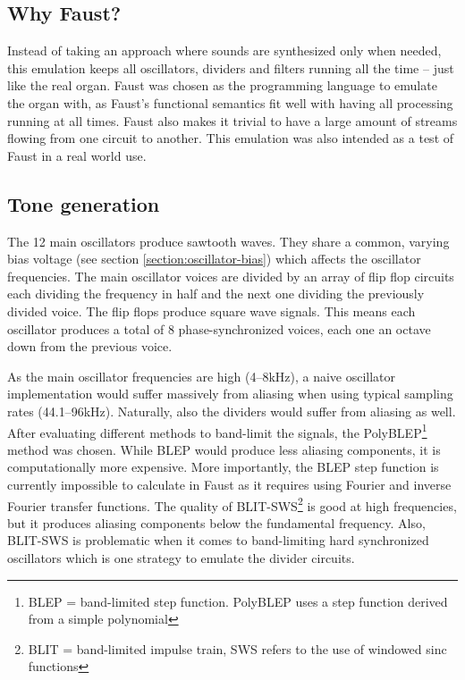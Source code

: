 \documentclass[11pt,a4paper]{article}
\begin{document}
\subsection{Why Faust?}

Instead of taking an approach where sounds are synthesized only when needed, this emulation keeps all oscillators, dividers and filters running all the time -- just like the real organ. Faust was chosen as the programming language to emulate the organ with, as Faust's functional semantics fit well with having all processing running at all times. Faust also makes it trivial to have a large amount of streams flowing from one circuit to another. This emulation was also intended as a test of Faust in a real world use.

\subsection{Tone generation}
\label{section:tone-generation}

The 12 main oscillators produce sawtooth waves. They share a common, varying bias voltage (see section \ref{section:oscillator-bias}) which affects the oscillator frequencies. The main oscillator voices are divided by an array of flip flop circuits each dividing the frequency in half and the next one dividing the previously divided voice. The flip flops produce square wave signals. This means each oscillator produces a total of  8 phase-synchronized voices, each one an octave down from the previous voice.

As the main oscillator frequencies are high (4--8kHz), a naive oscillator implementation would suffer massively from aliasing when using typical sampling rates (44.1--96kHz). Naturally, also the dividers would suffer from aliasing as well. After evaluating different methods to band-limit the signals, the PolyBLEP\footnote{BLEP = band-limited step function. PolyBLEP uses a step function derived from a simple polynomial}\cite{antialiasing} method was chosen. While BLEP\cite{hardsync} would produce less aliasing components, it is computationally more expensive. More importantly, the BLEP step function is currently impossible to calculate in Faust as it requires using Fourier and inverse Fourier transfer functions. The quality of BLIT-SWS\footnote{BLIT = band-limited impulse train, SWS refers to the use of windowed sinc functions}\cite{blit} is good at high frequencies, but it produces aliasing components below the fundamental frequency\cite{antialiasing}. Also, BLIT-SWS is problematic when it comes to band-limiting hard synchronized oscillators\cite{hardsync} which is one strategy to emulate the divider circuits.
\end{document}
